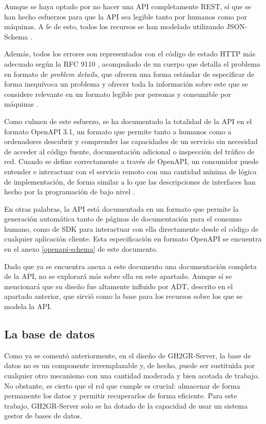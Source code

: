Aunque se haya optado por no hacer una \acrshort{API} completamente \acrshort{REST}, sí que se han hecho esfuerzos para que la \acrshort{API} sea legible tanto por humanos como por máquinas. A fe de esto, todos los recursos se han modelado utilizando JSON-Schema \cite{jsonschemaJSONSchema}. 

Además, todos los errores son representados con el código de estado \acrshort{HTTP} más adecuado según la RFC 9110 \cite{rfc9110}, acompañado de un cuerpo que detalla el problema en formato de \textit{problem details}, que ofrecen una forma estándar de especificar de forma inequívoca un problema y ofrecer toda la información sobre este que se considere relevante en un formato legible por personas y consumible por máquinas \cite{rfc9457}. 

Como culmen de este esfuerzo, se ha documentado la totalidad de la \acrshort{API} en el formato OpenAPI 3.1, un formato que permite tanto a humanos como a ordenadores descubrir y comprender las capacidades de un servicio sin necesidad de acceder al código fuente, documentación adicional o inspección del tráfico de red. Cuando se define correctamente a través de OpenAPI, un consumidor puede entender e interactuar con el servicio remoto con una cantidad mínima de lógica de implementación, de forma similar a lo que las descripciones de interfaces han hecho por la programación de bajo nivel \cite{openapisOpenAPISpecification}. 

En otras palabras, la \acrshort{API} está documentada en un formato que permite la generación automática tanto de páginas de documentación para el consumo humano, como de \acrshort{SDK} para interactuar con ella directamente desde el código de cualquier aplicación cliente. Esta especificación en formato OpenAPI se encuentra en el anexo \ref{openapi-schema} de este documento.

Dado que ya se encuentra anexa a este documento una documentación completa de la \acrshort{API}, no se explorará más sobre ella en este apartado. Aunque sí se mencionará que su diseño fue altamente influido por \acrshort{ADT}, descrito en el apartado anterior, que sirvió como la base para los recursos sobre los que se modela la \acrshort{API}.
\subsection{La base de datos}
Como ya se comentó anteriormente, en el diseño de GH2GR-Server, la base de datos no es un componente irreemplazable y, de hecho, puede ser sustituida por cualquier otro mecanismo con una cantidad moderada y bien acotada de trabajo. No obstante, es cierto que el rol que cumple es crucial: almacenar de forma permanente los datos y permitir recuperarlos de forma eficiente. Para este trabajo, GH2GR-Server solo se ha dotado de la capacidad de usar un sistema gestor de bases de datos.

